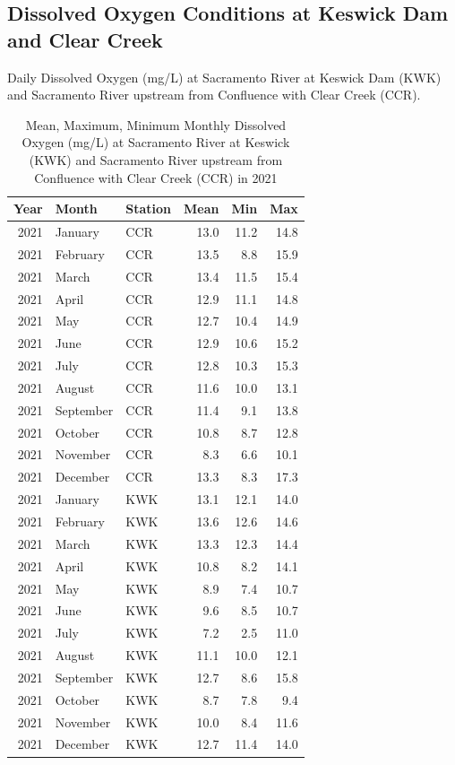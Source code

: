 \documentclass[
]{book}
\theoremstyle{definition}
\theoremstyle{definition}
\theoremstyle{definition}
\theoremstyle{definition}
\theoremstyle{remark}
\begin{document}
\hypertarget{dissolved-oxygen-conditions-at-keswick-dam-and-clear-creek}{%
\subsection{Dissolved Oxygen Conditions at Keswick Dam and Clear Creek}\label{dissolved-oxygen-conditions-at-keswick-dam-and-clear-creek}}

\label{fig:KWKCCRDO-fig}Daily Dissolved Oxygen (mg/L) at Sacramento River at Keswick Dam (KWK) and Sacramento River upstream from Confluence with Clear Creek (CCR).

\begin{table}
\centering
\caption{Mean, Maximum, Minimum Monthly Dissolved Oxygen (mg/L) at Sacramento River at Keswick (KWK) and Sacramento River upstream from Confluence with Clear Creek (CCR)  in 2021}
\centering
\begin{tabular}[t]{rllrrr}
\hline
Year & Month & Station & Mean & Min & Max\\
\hline
2021 & January & CCR & 13.0 & 11.2 & 14.8\\
\hline
2021 & February & CCR & 13.5 & 8.8 & 15.9\\
\hline
2021 & March & CCR & 13.4 & 11.5 & 15.4\\
\hline
2021 & April & CCR & 12.9 & 11.1 & 14.8\\
\hline
2021 & May & CCR & 12.7 & 10.4 & 14.9\\
\hline
2021 & June & CCR & 12.9 & 10.6 & 15.2\\
\hline
2021 & July & CCR & 12.8 & 10.3 & 15.3\\
\hline
2021 & August & CCR & 11.6 & 10.0 & 13.1\\
\hline
2021 & September & CCR & 11.4 & 9.1 & 13.8\\
\hline
2021 & October & CCR & 10.8 & 8.7 & 12.8\\
\hline
2021 & November & CCR & 8.3 & 6.6 & 10.1\\
\hline
2021 & December & CCR & 13.3 & 8.3 & 17.3\\
\hline
2021 & January & KWK & 13.1 & 12.1 & 14.0\\
\hline
2021 & February & KWK & 13.6 & 12.6 & 14.6\\
\hline
2021 & March & KWK & 13.3 & 12.3 & 14.4\\
\hline
2021 & April & KWK & 10.8 & 8.2 & 14.1\\
\hline
2021 & May & KWK & 8.9 & 7.4 & 10.7\\
\hline
2021 & June & KWK & 9.6 & 8.5 & 10.7\\
\hline
2021 & July & KWK & 7.2 & 2.5 & 11.0\\
\hline
2021 & August & KWK & 11.1 & 10.0 & 12.1\\
\hline
2021 & September & KWK & 12.7 & 8.6 & 15.8\\
\hline
2021 & October & KWK & 8.7 & 7.8 & 9.4\\
\hline
2021 & November & KWK & 10.0 & 8.4 & 11.6\\
\hline
2021 & December & KWK & 12.7 & 11.4 & 14.0\\
\hline
\end{tabular}
\end{table}
\end{document}
